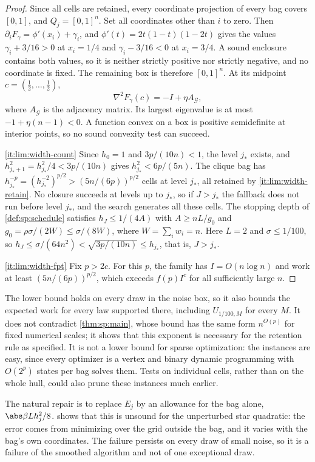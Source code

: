 \begin{proof}
Since all cells are retained, every coordinate projection of every bag
covers $[0,1]$, and $Q_j=[0,1]^n$. Set all coordinates other than $i$ to
zero. Then $\partial_iF_\gamma=\phi'(x_i)+\gamma_i$, and
$\phi'(t)=2t(1-t)(1-2t)$ gives the values $\gamma_i+3/16>0$ at $x_i=1/4$
and $\gamma_i-3/16<0$ at $x_i=3/4$. A sound enclosure contains both values,
so it is neither strictly positive nor strictly negative, and no coordinate
is fixed. The remaining box is therefore $[0,1]^n$. At its midpoint
$c=(\frac12,\ldots,\frac12)$,
\[
 \nabla^2F_\gamma(c)=-I+\eta A_{\mathcal G},
\]
where $A_{\mathcal G}$ is the adjacency matrix. Its largest eigenvalue is at
most $-1+\eta(n-1)<0$. A function convex on a box is positive semidefinite
at interior points, so no sound convexity test can succeed.

\ref{it:lim:width-count}
Since $h_0=1$ and $3p/(10n)<1$, the level $j_*$ exists, and
$h_{j_*+1}^2=h_{j_*}^2/4<3p/(10n)$ gives $h_{j_*}^2<6p/(5n)$. The clique bag
has $h_{j_*}^{-p}=(h_{j_*}^{-2})^{p/2}>(5n/(6p))^{p/2}$ cells at level
$j_*$, all retained by \ref{it:lim:width-retain}. No closure succeeds at
levels up to $j_*$, so if $J>j_*$ the fallback does not run before level
$j_*$, and the search generates all these cells. The stopping depth of
\cref{def:sp:schedule} satisfies $h_J\le1/(4A)$ with $A\ge nL/g_0$ and
$g_0=\rho\sigma/(2W)\le\sigma/(8W)$, where $W=\sum_iw_i=n$. Here $L=2$ and
$\sigma\le1/100$, so $h_J\le\sigma/(64n^2)<\sqrt{3p/(10n)}\le h_{j_*}$, that
is, $J>j_*$.

\ref{it:lim:width-fpt}
Fix $p>2c$. For this $p$, the family has $I=O(n\log n)$ and work at least
$(5n/(6p))^{p/2}$, which exceeds $f(p)I^c$ for all sufficiently large $n$.
\end{proof}

The lower bound holds on every draw in the noise box, so it also bounds the
expected work for every law supported there, including $U_{1/100,M}$ for
every $M$. It does not contradict \cref{thm:sp:main}, whose bound has the
same form $n^{O(p)}$ for fixed numerical scales; it shows that this
exponent is necessary for the retention rule as specified. It is not a lower
bound for sparse optimization: the instances are easy, since every
optimizer is a vertex and binary dynamic programming with $O(2^p)$ states
per bag solves them. Tests on individual cells, rather than on the whole
hull, could also prune these instances much earlier.

The natural repair is to replace $E_j$ by an allowance for the bag alone,
$\abs\beta Lh_j^2/8$.  shows that this is unsound for the
unperturbed star quadratic: the error comes from minimizing over the grid
outside the bag, and it varies with the bag's own coordinates. The failure
persists on every draw of small noise, so it is a failure of the smoothed
algorithm and not of one exceptional draw.

